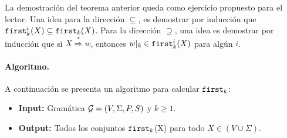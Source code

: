 La demostración del teorema anterior queda como ejercicio propuesto para el lector. Una idea para la dirección $\subseteq$, es demostrar por inducción que $\texttt{first}_k^i(X) \subseteq \texttt{first}_k(X)$. Para la dirección $\supseteq$, una idea es demostrar por inducción que si $X \overset{*}{\Rightarrow} w$, entonces $w|_k \in \texttt{first}_k^i(X)$ para algún $i$.

\paragraph{Algoritmo.} A continuación se presenta un algoritmo para calcular $\texttt{first}_k$:
\begin{itemize}
    \item \textbf{Input:} Gramática $\mathcal{G}=(V,\Sigma, P, S)$ y $k\ge 1$.
    \item \textbf{Output:} Todos los conjuntos $\texttt{first}_k$(X) para todo $X \in (V\cup\Sigma)$.
\end{itemize}
\vspace{-15pt}
\begin{algorithm}[hbt!]
    \DontPrintSemicolon
\end{algorithm}
\vspace{-15pt}

